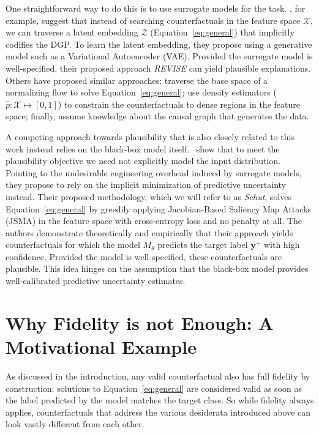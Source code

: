 \documentclass[letterpaper]{article} %
\begin{document}
One straightforward way to do this is to use surrogate models for the task. \citet{joshi2019realistic}, for example, suggest that instead of searching counterfactuals in the feature space $\mathcal{X}$, we can traverse a latent embedding $\mathcal{Z}$ (Equation~\ref{eq:general}) that implicitly codifies the DGP. To learn the latent embedding, they propose using a generative model such as a Variational Autoencoder (VAE). Provided the surrogate model is well-specified, their proposed approach \textit{REVISE} can yield plausible explanations. Others have proposed similar approaches: \citet{dombrowski2021diffeomorphic} traverse the base space of a normalizing flow to solve Equation~\ref{eq:general}; \citet{poyiadzi2020face} use density estimators ($\hat{p}: \mathcal{X} \mapsto [0,1]$) to constrain the counterfactuals to dense regions in the feature space; finally, \citet{karimi2021algorithmic} assume knowledge about the causal graph that generates the data.

A competing approach towards plausibility that is also closely related to this work instead relies on the black-box model itself.~\citet{schut2021generating} show that to meet the plausibility objective we need not explicitly model the input distribution. Pointing to the undesirable engineering overhead induced by surrogate models, they propose to rely on the implicit minimization of predictive uncertainty instead. Their proposed methodology, which we will refer to as \textit{Schut}, solves Equation~\ref{eq:general} by greedily applying Jacobian-Based Saliency Map Attacks (JSMA) in the feature space with cross-entropy loss and no penalty at all. The authors demonstrate theoretically and empirically that their approach yields counterfactuals for which the model $M_{\theta}$ predicts the target label $\mathbf{y}^+$ with high confidence. Provided the model is well-specified, these counterfactuals are plausible. This idea hinges on the assumption that the black-box model provides well-calibrated predictive uncertainty estimates.

\section{Why Fidelity is not Enough: A Motivational Example}\label{fidelity}

As discussed in the introduction, any valid counterfactual also has full fidelity by construction: solutions to Equation~\ref{eq:general} are considered valid as soon as the label predicted by the model matches the target class. So while fidelity always applies, counterfactuals that address the various desiderata introduced above can look vastly different from each other. 
\end{document}
